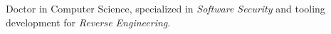 %
%
%

\begin{center}
    \par{
        Doctor in Computer Science, specialized in \emph{Software Security} and tooling development for \emph{Reverse Engineering}.
    }
\end{center}

\vspace{1em}